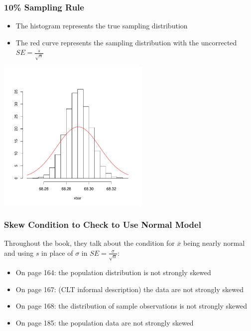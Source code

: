 \documentclass[handout]{beamer}
\newcommand{\blue}[1]{\textcolor{blue2}{#1}}
\newcommand{\xbar}{\overline{x}}
\begin{document}
\begin{frame}[fragile]
\frametitle{10\% Sampling Rule} 
\begin{itemize}
\item The histogram represents the true sampling distribution
\item The red curve represents the sampling distribution with the \blue{uncorrected} $SE=\frac{s}{\sqrt{n}}$
\end{itemize}

\begin{center}
\includegraphics[width=0.55\textwidth]{figure/FPC.pdf}
\end{center}

\end{frame}







\begin{frame}
\frametitle{Skew Condition to Check to Use Normal Model}
Throughout the book, they talk about the condition for $\xbar$ being nearly normal and using $s$ in place of $\sigma$ in $SE=\frac{\sigma}{\sqrt{n}}$:

\vspace{0.25cm}

\begin{itemize}
\pause\item On page 164: the population distribution is not strongly skewed
\pause\item On page 167: (CLT informal description) the data are not strongly skewed
\pause\item On page 168: the distribution of sample observations is not strongly skewed
\pause\item On page 185: the population data are not strongly skewed
\end{itemize}

\end{frame}
\end{document}
